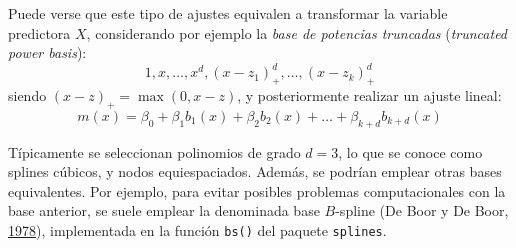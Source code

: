 \documentclass[
  spanish,
]{book}
\theoremstyle{break}
\theoremstyle{definition}
\theoremstyle{definition}
\theoremstyle{definition}
\theoremstyle{remark}
\begin{document}
Puede verse que este tipo de ajustes equivalen a transformar la variable predictora \(X\), considerando por ejemplo la \emph{base de potencias truncadas} (\emph{truncated power basis}):
\[1, x, \ldots, x^d, (x-z_1)_+^d,\ldots,(x-z_k)_+^d\]
siendo \((x - z)_+ = \max(0, x - z)\), y posteriormente realizar un ajuste lineal:
\[m(x) = \beta_0 + \beta_1 b_1(x) +  \beta_2 b_2(x) + \ldots  + \beta_{k+d} b_{k+d}(x)\]

Típicamente se seleccionan polinomios de grado \(d=3\), lo que se conoce como splines cúbicos, y nodos equiespaciados.
Además, se podrían emplear otras bases equivalentes. Por ejemplo, para evitar posibles problemas computacionales con la base anterior, se suele emplear la denominada base \(B\)-spline (De Boor y De Boor, \protect\hyperlink{ref-de1978practical}{1978}), implementada en la función \texttt{bs()} del paquete \texttt{splines}.
\end{document}
